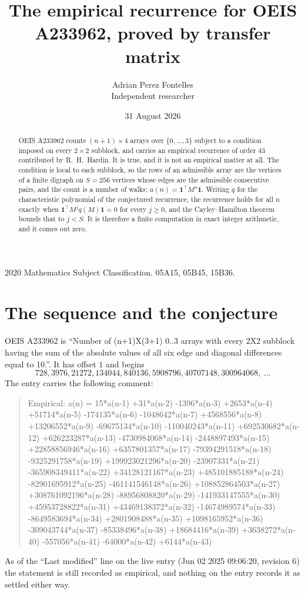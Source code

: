 \documentclass[11pt,a4paper]{article}
\title{The empirical recurrence for OEIS A233962, proved by transfer matrix}
\author{Adrian Perez Fontelles\\ \small Independent researcher}
\date{31 August 2026}
\theoremstyle{plain}
\theoremstyle{definition}
\begin{document}
\maketitle

\begin{abstract}
OEIS A233962 counts $(n+1)\times4$ arrays over $\{0,\dots,3\}$ subject to a condition imposed on
every $2\times2$ subblock, and carries an empirical recurrence of order $43$ contributed
by R.~H.~Hardin. It is true, and it is not an empirical matter at all. The condition is local
to each subblock, so the rows of an admissible array are the vertices of a finite digraph
on $S=256$ vertices whose edges are the admissible consecutive pairs, and the count is a
number of walks: $a(n)=\mathbf{1}^{\!\top}M^{n}\mathbf{1}$. Writing $q$
for the characteristic polynomial of the conjectured recurrence, the recurrence holds for all
$n$ exactly when $\mathbf{1}^{\!\top}M^{j}q(M)\mathbf{1}=0$ for every $j\ge0$, and the
Cayley--Hamilton theorem bounds that to $j<S$. It is therefore a finite computation in exact
integer arithmetic, and it comes out zero.
\end{abstract}

\noindent\small 2020 Mathematics Subject Classification. 05A15, 05B45, 15B36.\normalsize

\section{The sequence and the conjecture}

OEIS A233962 is ``Number of (n+1)X(3+1) 0..3 arrays with every 2X2 subblock having the sum of the absolute values of all six edge and diagonal differences equal to 10.''. It has offset $1$ and begins
\[
728, 3976, 21272, 134044, 840136, 5908796, 40707148, 300964068,\ \dots
\]
The entry carries the following comment:
\begin{quote}\small
Empirical: a(n) = 15*a(n-1) +31*a(n-2) -1396*a(n-3) +2653*a(n-4) +51714*a(n-5) -174135*a(n-6) -1048642*a(n-7) +4568556*a(n-8) +13206552*a(n-9) -69675134*a(n-10) -110040243*a(n-11) +692530682*a(n-12) +626223287*a(n-13) -4730984068*a(n-14) -2448897493*a(n-15) +22858856946*a(n-16) +6357801357*a(n-17) -79394291518*a(n-18) -9325291758*a(n-19) +199923021296*a(n-20) -23907331*a(n-21) -365908349411*a(n-22) +34128121167*a(n-23) +485101885188*a(n-24) -82901695912*a(n-25) -461141546148*a(n-26) +108852864503*a(n-27) +308761092196*a(n-28) -88956808820*a(n-29) -141933147555*a(n-30) +45953728822*a(n-31) +43469138372*a(n-32) -14674989574*a(n-33) -8649583694*a(n-34) +2801908488*a(n-35) +1098165952*a(n-36) -309043744*a(n-37) -85338496*a(n-38) +18684416*a(n-39) +3638272*a(n-40) -557056*a(n-41) -64000*a(n-42) +6144*a(n-43)
\end{quote}
As of the ``Last modified'' line on the live entry (Jun 02 2025 09:06:20, revision 6) the statement is
still recorded as empirical, and nothing on the entry records it as settled either way.
\end{document}
